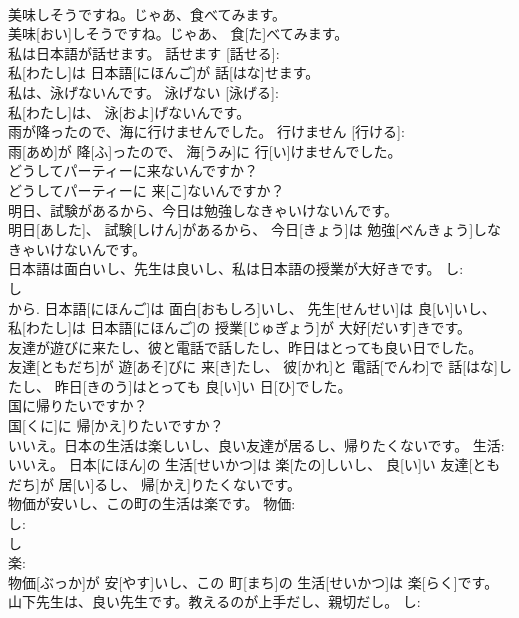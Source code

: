 \documentclass[8pt]{extreport}
\begin{document}
\begin{CJK}{UTF8}{min}
\\	美味しそうですね。じゃあ、食べてみます。	
\\	美味[おい]しそうですね。じゃあ、 食[た]べてみます。	
\\	私は日本語が話せます。	話せます [話せる]: 
\\	私[わたし]は 日本語[にほんご]が 話[はな]せます。	
\\	私は、泳げないんです。	泳げない [泳げる]: 
\\	私[わたし]は、 泳[およ]げないんです。	
\\	雨が降ったので、海に行けませんでした。	行けません [行ける]: 
\\	雨[あめ]が 降[ふ]ったので、 海[うみ]に 行[い]けませんでした。	
\\	どうしてパーティーに来ないんですか？	
\\	どうしてパーティーに 来[こ]ないんですか？	
\\	明日、試験があるから、今日は勉強しなきゃいけないんです。	
\\	明日[あした]、 試験[しけん]があるから、 今日[きょう]は 勉強[べんきょう]しなきゃいけないんです。	
\\	日本語は面白いし、先生は良いし、私は日本語の授業が大好きです。	し: 
\\	し 
\\	から.	日本語[にほんご]は 面白[おもしろ]いし、 先生[せんせい]は 良[い]いし、 私[わたし]は 日本語[にほんご]の 授業[じゅぎょう]が 大好[だいす]きです。	
\\	友達が遊びに来たし、彼と電話で話したし、昨日はとっても良い日でした。	
\\	友達[ともだち]が 遊[あそ]びに 来[き]たし、 彼[かれ]と 電話[でんわ]で 話[はな]したし、 昨日[きのう]はとっても 良[い]い 日[ひ]でした。	
\\	国に帰りたいですか？	
\\	国[くに]に 帰[かえ]りたいですか？	
\\	いいえ。日本の生活は楽しいし、良い友達が居るし、帰りたくないです。	生活: 
\\	いいえ。 日本[にほん]の 生活[せいかつ]は 楽[たの]しいし、 良[い]い 友達[ともだち]が 居[い]るし、 帰[かえ]りたくないです。	
\\	物価が安いし、この町の生活は楽です。	物価: 
\\	し: 
\\	し 
\\	楽: 
\\	物価[ぶっか]が 安[やす]いし、この 町[まち]の 生活[せいかつ]は 楽[らく]です。	
\\	山下先生は、良い先生です。教えるのが上手だし、親切だし。	し: 

\end{CJK}
\end{document}
